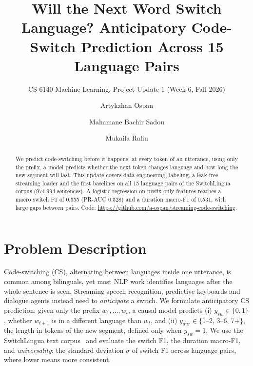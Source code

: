\documentclass[sigconf,nonacm]{acmart}
\begin{document}
\title{Will the Next Word Switch Language? Anticipatory Code-Switch Prediction Across 15 Language Pairs}
\subtitle{CS 6140 Machine Learning, Project Update 1 (Week 6, Fall 2026)}

\author{Artykzhan Ospan}
\author{Mahamane Bachir Sadou}
\author{Mukaila Rafiu}

\begin{abstract}
We predict code-switching before it happens: at every token of an utterance, using only the prefix, a model
predicts whether the next token changes language and how long the new segment will last. This update
covers data engineering, labeling, a leak-free streaming loader and the first baselines on all 15 language
pairs of the SwitchLingua corpus (974,994 sentences). A logistic regression on prefix-only features reaches a
macro switch F1 of 0.555 (PR-AUC 0.528) and a duration macro-F1 of 0.531, with large gaps between pairs.
Code: \url{https://github.com/a-ospan/streaming-code-switching}.
\end{abstract}

\maketitle

\section{Problem Description}
Code-switching (CS), alternating between languages inside one utterance, is common among bilinguals, yet most
NLP work identifies languages after the whole sentence is seen. Streaming speech recognition, predictive
keyboards and dialogue agents instead need to \emph{anticipate} a switch. We formulate anticipatory CS
prediction: given only the prefix $w_1,\dots,w_t$, a causal model predicts (i) $y_{sw}\in\{0,1\}$, whether
$w_{t+1}$ is in a different language than $w_t$, and (ii) $y_{dur}\in\{$1--2, 3--6, 7+$\}$, the length in
tokens of the new segment, defined only when $y_{sw}=1$. We use the SwitchLingua text corpus~\cite{xie2025switchlingua}
and evaluate the switch F1, the duration macro-F1, and \emph{universality}: the standard deviation $\sigma$
of switch F1 across language pairs, where lower means more consistent.
\end{document}
